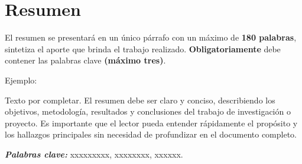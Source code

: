 \chapter*{Resumen}

El resumen se presentará en un único párrafo con un máximo de \textbf{180 palabras}, sintetiza el aporte que brinda el trabajo realizado. \textbf{Obligatoriamente} debe contener las palabras clave \textbf{(máximo tres)}.

\vspace{0.5cm}

Ejemplo:

\vspace{0.5cm}

Texto por completar. El resumen debe ser claro y conciso, describiendo los objetivos, metodología, resultados y conclusiones del trabajo de investigación o proyecto. Es importante que el lector pueda entender rápidamente el propósito y los hallazgos principales sin necesidad de profundizar en el documento completo.
\vspace{0.5cm}

\textbf{\textit{Palabras clave:}} xxxxxxxxx, xxxxxxxx, xxxxxx.